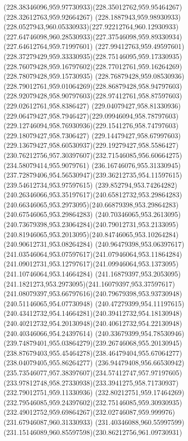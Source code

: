 {{	\curveto(228.38346096,959.97730933)(228.35012762,959.95464267)(228.32612763,959.92664267)
	\curveto(228.1887943,959.98930933)(228.0527943,960.05330933)(227.92212764,960.12930933)
	\curveto(227.64746098,960.28530933)(227.37546098,959.89330934)(227.64612764,959.71997601)
	\curveto(227.99412763,959.49597601)(228.37279429,959.33330935)(228.75146095,959.17330935)
	\curveto(228.76079428,959.16797602)(228.77012761,959.16264269)(228.78079428,959.15730935)
	\curveto(228.76879428,959.08530936)(228.79012761,959.01064269)(228.86879428,958.94797603)
	\curveto(228.92079428,958.90797603)(228.97412761,958.87597603)(229.02612761,958.8386427)
	\curveto(229.04079427,958.81330936)(229.06479427,958.7946427)(229.09946094,958.78797603)
	\curveto(229.12746094,958.76930936)(229.1541276,958.74797603)(229.18079427,958.7306427)
	\curveto(229.14479427,958.67997603)(229.13679427,958.60530937)(229.19279427,958.5586427)
	\curveto(230.76212756,957.30397607)(232.71546085,956.60664275)(234.58079414,955.9079761)
	\curveto(236.16746076,955.31330945)(237.72879406,954.56530947)(239.36212735,954.11597615)
	\lineto(239.54612734,953.97597615)
	\curveto(239.852794,953.74264282)(240.26346066,953.35197617)(240.65812732,953.29864283)
	\curveto(240.66346065,953.2973095)(240.66879398,953.29864283)(240.67546065,953.29864283)
	\curveto(240.70346065,953.2613095)(240.73679398,953.23064284)(240.79012731,953.2133095)
	\curveto(240.81946065,953.2013095)(240.84746065,953.10264284)(240.90612731,953.08264284)
	\curveto(240.96479398,953.06397617)(241.03546064,953.07597617)(241.07946064,953.11864284)
	\curveto(241.09012731,953.12797617)(241.09946064,953.1373095)(241.10746064,953.14664284)
	\curveto(241.16879397,953.2053095)(241.1821273,953.2973095)(241.16079397,953.37597617)
	\curveto(241.08079397,953.66797616)(240.79679398,953.93730948)(240.51146065,954.07730948)
	\curveto(240.47279399,954.11197615)(240.43412732,954.14664281)(240.39412732,954.18130948)
	\curveto(240.40212732,954.20130948)(240.40612732,954.22130948)(240.40346066,954.24397614)
	\curveto(240.33679399,954.78530946)(239.74879401,955.03864279)(239.26746068,955.20130945)
	\curveto(238.87679403,955.45464278)(238.46479404,955.67064277)(238.04079405,955.86264277)
	\curveto(236.94479408,956.66530942)(235.73546077,957.38397607)(234.57412747,957.97197605)
	\curveto(233.97812748,958.27330938)(233.3941275,958.71730937)(232.79012751,959.11330936)
	\curveto(232.80212751,959.17464269)(232.79546085,959.24397602)(232.75146085,959.30930935)
	\curveto(232.49012752,959.69864267)(232.02746087,959.999976)(231.67946087,960.31330933)
	\curveto(231.40346088,960.55997599)(231.15146089,960.85597598)(230.86212756,961.09730931)
}}
